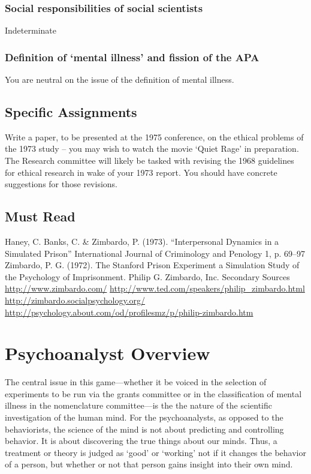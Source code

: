 \begin{refsection}
\subsubsection{Social responsibilities of social scientists}
\label{socialresponsibilitiesofsocialscientists}

Indeterminate

\subsubsection{Definition of ‘mental illness’ and fission of the APA}
\label{definitionof‘mentalillness’andfissionoftheapa}

You are neutral on the issue of the definition of mental illness.

\subsection{Specific Assignments}
\label{specificassignments}

Write a paper, to be presented at the 1975 conference, on the ethical problems of the 1973 study – you may wish to watch the movie `Quiet Rage' in preparation. The Research committee will likely be tasked with revising the 1968 guidelines for ethical research in wake of your 1973 report. You should have concrete suggestions for those revisions.

\subsection{Must Read}
\label{mustread}

Haney, C. Banks, C. \& Zimbardo, P. (1973). “Interpersonal Dynamics in a Simulated Prison” International Journal of Criminology and Penology 1, p. 69--97
Zimbardo, P. G. (1972). The Stanford Prison Experiment a Simulation Study of the Psychology of Imprisonment. Philip G. Zimbardo, Inc.
Secondary Sources
\url{http://www.zimbardo.com/}
\url{http://www.ted.com/speakers/philip_zimbardo.html}
\url{http://zimbardo.socialpsychology.org/}
\url{http://psychology.about.com/od/profilesmz/p/philip-zimbardo.htm}

\pagebreak 

\section{Psychoanalyst Overview}
\label{psychoanalystoverview}

The central issue in this game—whether it be voiced in the selection of experiments to be run via the grants committee or in the classification of mental illness in the nomenclature committee—is the the nature of the scientific investigation of the human mind. For the psychoanalysts, as opposed to the behaviorists, the science of the mind is not about predicting and controlling behavior. It is about discovering the true things about our minds. Thus, a treatment or theory is judged as `good' or `working' not if it changes the behavior of a person, but whether or not that person gains insight into their own mind.


\end{refsection}
